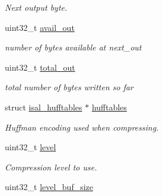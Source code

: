 \begin{DoxyCompactItemize}
\begin{DoxyCompactList}\small\item\em Next output byte. \end{DoxyCompactList}\item 
\hypertarget{structisal__zstream_a2f960cdd24b681b8cb007e0c7bf95ef3}{uint32\-\_\-t \hyperlink{structisal__zstream_a2f960cdd24b681b8cb007e0c7bf95ef3}{avail\-\_\-out}}\label{structisal__zstream_a2f960cdd24b681b8cb007e0c7bf95ef3}

\begin{DoxyCompactList}\small\item\em number of bytes available at next\-\_\-out \end{DoxyCompactList}\item 
\hypertarget{structisal__zstream_ab8e856611ff7bb74b07b8181c65a3ac9}{uint32\-\_\-t \hyperlink{structisal__zstream_ab8e856611ff7bb74b07b8181c65a3ac9}{total\-\_\-out}}\label{structisal__zstream_ab8e856611ff7bb74b07b8181c65a3ac9}

\begin{DoxyCompactList}\small\item\em total number of bytes written so far \end{DoxyCompactList}\item 
\hypertarget{structisal__zstream_aa7df05aaedba218a462bd8618bbb1e14}{struct \hyperlink{structisal__hufftables}{isal\-\_\-hufftables} $\ast$ \hyperlink{structisal__zstream_aa7df05aaedba218a462bd8618bbb1e14}{hufftables}}\label{structisal__zstream_aa7df05aaedba218a462bd8618bbb1e14}

\begin{DoxyCompactList}\small\item\em Huffman encoding used when compressing. \end{DoxyCompactList}\item 
\hypertarget{structisal__zstream_ab6400b8e160686601593acfbbb9576c7}{uint32\-\_\-t \hyperlink{structisal__zstream_ab6400b8e160686601593acfbbb9576c7}{level}}\label{structisal__zstream_ab6400b8e160686601593acfbbb9576c7}

\begin{DoxyCompactList}\small\item\em Compression level to use. \end{DoxyCompactList}\item 
\hypertarget{structisal__zstream_a38161009752cf0dcf95aec62ce6826a5}{uint32\-\_\-t \hyperlink{structisal__zstream_a38161009752cf0dcf95aec62ce6826a5}{level\-\_\-buf\-\_\-size}}\label{structisal__zstream_a38161009752cf0dcf95aec62ce6826a5}


\end{DoxyCompactItemize}
